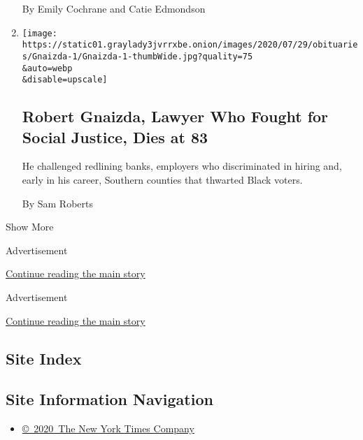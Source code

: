 \begin{enumerate}
  By Emily Cochrane and Catie Edmondson
\item
  \href{/2020/08/01/us/robert-gnaizda-dead.html}{}

  \texttt{[image: https://static01.graylady3jvrrxbe.onion/images/2020/07/29/obituaries/Gnaizda-1/Gnaizda-1-thumbWide.jpg?quality=75\\\&auto=webp\\\&disable=upscale]}

  \hypertarget{robert-gnaizda-lawyer-who-fought-for-social-justice-dies-at-83}{%
  \subsection{Robert Gnaizda, Lawyer Who Fought for Social Justice, Dies
  at
  83}\label{robert-gnaizda-lawyer-who-fought-for-social-justice-dies-at-83}}

  He challenged redlining banks, employers who discriminated in hiring
  and, early in his career, Southern counties that thwarted Black
  voters.

  By Sam Roberts
\end{enumerate}

Show More

Advertisement

\protect\hyperlink{after-mid2}{Continue reading the main story}

Advertisement

\protect\hyperlink{after-mktg}{Continue reading the main story}

\hypertarget{site-index}{%
\subsection{Site Index}\label{site-index}}

\hypertarget{site-information-navigation}{%
\subsection{Site Information
Navigation}\label{site-information-navigation}}

\begin{itemize}
\tightlist
\item
  \href{https://help.nytimes3xbfgragh.onion/hc/en-us/articles/115014792127-Copyright-notice}{©~2020~The
  New York Times Company}
\end{itemize}

